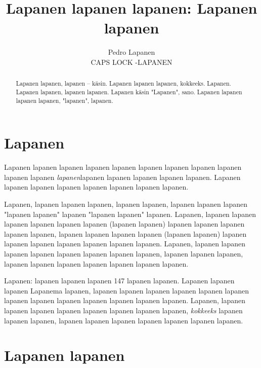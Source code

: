 \documentclass[a4paper]{article}
\title{Lapanen lapanen lapanen: Lapanen lapanen}
\date{}
\author{Pedro Lapanen\\CAPS LOCK -LAPANEN}
\begin{document}
\maketitle

\begin{multicols}{2}

\renewcommand{\abstractname}{Lapaslapanen}

\begin{abstract}

Lapanen lapanen, lapanen -- käsin. Lapanen lapanen lapanen, kokkeeks. Lapanen. Lapanen lapanen, lapanen lapanen.
Lapanen käsin "Lapanen", sano. Lapanen lapanen lapanen lapanen, "lapanen", lapanen.

\end{abstract}


\section{Lapanen}

Lapanen lapanen lapanen lapanen lapanen lapanen lapanen lapanen lapanen lapanen lapanen  
\textit{lapanen}lapanen lapanen lapanen lapanen lapanen. 
Lapanen lapanen lapanen lapanen lapanen lapanen lapanen lapanen.

Lapanen, lapanen lapanen lapanen, lapanen lapanen, lapanen lapanen lapanen "lapanen lapanen" lapanen "lapanen lapanen" lapanen.
Lapanen, lapanen lapanen lapanen lapanen lapanen lapanen (lapanen lapanen) \cite{lapanen} lapanen lapanen lapanen lapanen lapanen,
lapanen lapanen lapanen lapanen (lapanen lapanen) lapanen lapanen lapanen lapanen lapanen lapanen lapanen.
Lapanen, lapanen lapanen lapanen lapanen lapanen lapanen lapanen lapanen, lapanen lapanen lapanen, lapanen lapanen lapanen lapanen lapanen lapanen lapanen.

Lapanen: lapanen lapanen lapanen 147 lapanen lapanen. Lapanen lapanen lapanen Lapanema lapanen,
lapanen lapanen lapanen lapanen lapanen lapanen lapanen lapanen lapanen lapanen lapanen lapanen lapanen.
Lapanen, lapanen lapanen lapanen lapanen lapanen lapanen \cite{liplap} lapanen lapanen, \textit{kokkeeks} lapanen lapanen lapanen, lapanen lapanen lapanen lapanen lapanen lapanen lapanen.


\section{Lapanen lapanen}




\vfill\null
\columnbreak


\end{multicols}
\end{document}
